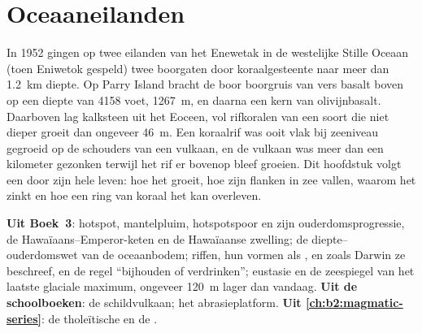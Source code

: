 \chapter{Oceaaneilanden}\label{ch:b2:oceanic-islands}

In 1952 gingen op twee eilanden van het  Enewetak in de westelijke Stille Oceaan (toen Eniwetok gespeld) twee
boorgaten door koraalgesteente naar meer dan \qty{1.2}{km} diepte. Op Parry Island bracht de boor
boorgruis van vers basalt boven op een diepte van 4158 voet, \qty{1267}{m}, en daarna een kern van
olivijnbasalt. Daarboven lag kalksteen uit het Eoceen, vol rifkoralen van een soort die niet
dieper groeit dan ongeveer \qty{46}{m}. Een koraalrif was ooit vlak bij zeeniveau gegroeid op de schouders van een vulkaan,
en de vulkaan was meer dan een kilometer gezonken terwijl het rif er bovenop bleef
groeien. Dit hoofdstuk volgt een  door zijn hele leven: hoe het groeit, hoe zijn flanken
in zee vallen, waarom het zinkt en hoe een ring van koraal het kan overleven.

\begin{recall}
\textbf{Uit Boek~3}: hotspot, mantelpluim, hotspotspoor en zijn ouderdomsprogressie,
de Hawaïaans–Emperor-keten en de Hawaïaanse zwelling; de diepte--ouderdomswet van de oceaanbodem; riffen,
hun vormen als ,  en  zoals Darwin ze beschreef, en de regel ``bijhouden of
verdrinken''; eustasie en de zeespiegel van het laatste glaciale maximum, ongeveer \qty{120}{m} lager dan
vandaag. \textbf{Uit de schoolboeken}: de schildvulkaan; het abrasieplatform.
\textbf{Uit \cref{ch:b2:magmatic-series}}: de tholeïtische en de .
\end{recall}

